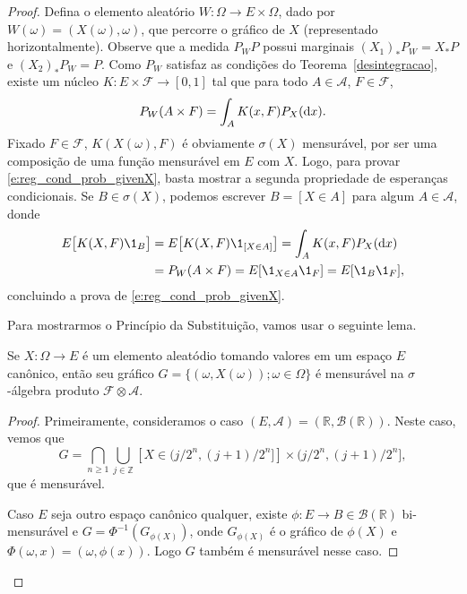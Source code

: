 \begin{proof}
  Defina o elemento aleatório $W: \Omega \to E \times \Omega$, dado por $W(\omega) = (X(\omega), \omega)$, que percorre o gráfico de $X$ (representado horizontalmente).
  Observe que a medida $P_W P$ possui marginais $(X_1)_* P_W = X_* P$ e $(X_2)_* P_W = P$.
  Como $P_W$ satisfaz as condições do Teorema~\ref{desintegracao}, existe um núcleo $K: E \times \mathcal{F} \to [0,1]$ tal que para todo $A \in \mathcal{A}$, $F \in \mathcal{F}$,
  \begin{equation}
    P_W(A \times F) = \int_A K(x, F) P_X (\mathop{}\!\mathrm{d} x).
  \end{equation}
  Fixado $F \in \mathcal{F}$, $K(X(\omega), F)$ é obviamente $\sigma(X)$ mensurável, por ser uma composição de uma função mensurável em $E$ com $X$.
  Logo, para provar \eqref{e:reg_cond_prob_givenX}, basta mostrar a segunda propriedade de esperanças condicionais.
  Se $B \in \sigma(X)$, podemos escrever $B = [X \in A]$ para algum $A \in \mathcal{A}$, donde
  \begin{equation}
    \begin{split}
      E\big[ K(X, F) \1_B \big] & = E\big[ K(X, F) \1_{[X \in A]} \big] = \int_A K(x, F) P_X(\d x)\\
      & = P_W (A \times F) = E[\1_{X \in A} \1_F] = E[\1_B \1_F],
    \end{split}
  \end{equation}
  concluindo a prova de \eqref{e:reg_cond_prob_givenX}.

  Para mostrarmos o Princípio da Substituição, vamos usar o seguinte lema.

  \begin{lemma}
    Se $X : \Omega \to E$ é um elemento aleatódio tomando valores em um espaço $E$ canônico, então seu gráfico $G = \{(\omega, X(\omega)); \omega \in \Omega\}$ é mensurável na $\sigma$-álgebra produto $\mathcal{F} \otimes \mathcal{A}$.
  \end{lemma}

  \begin{proof}
    Primeiramente, consideramos o caso $(E, \mathcal{A}) = (\mathbb{R}, \mathcal{B}(\mathbb{R}))$.
    Neste caso, vemos que
    \begin{equation}
      G = \bigcap_{n \geq 1} \bigcup_{j \in \mathbb{Z}} [X \in \big(j/2^n, (j+1)/2^n \big]] \times \big( j/2^n, (j+1)/2^n \big],
    \end{equation}
    que é mensurável.

    Caso $E$ seja outro espaço canônico qualquer, existe $\phi: E \to B \in \mathcal{B}(\mathbb{R})$ bi-mensurável e $G = \Phi^{-1}(G_{\phi(X)})$, onde 
    $G_{\phi(X)}$ é o gráfico de $\phi(X)$ e $\Phi(\omega, x) = (\omega, \phi(x))$.
    Logo $G$ também é mensurável nesse caso.
  \end{proof}


\end{proof}
